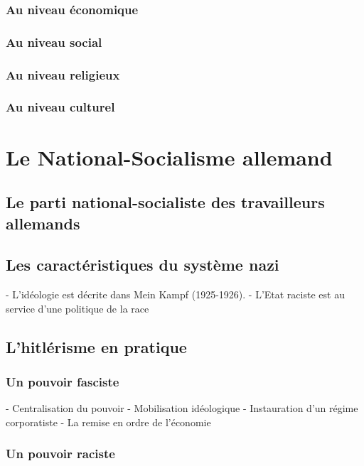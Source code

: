 \documentclass[12pt]{report}
\begin{document}
\subsubsection{Au niveau économique}

\subsubsection{Au niveau social}

\subsubsection{Au niveau religieux}

\subsubsection{Au niveau culturel}

\section{Le National-Socialisme allemand}

\subsection{Le parti national-socialiste des travailleurs allemands}

\subsection{Les caractéristiques du système nazi}

- L’idéologie est décrite dans Mein Kampf (1925-1926).
- L’Etat raciste est au service d’une politique de la race

\subsection{L'hitlérisme en pratique}

\subsubsection{Un pouvoir fasciste}

- Centralisation du pouvoir
- Mobilisation idéologique
- Instauration d’un régime corporatiste
- La remise en ordre de l’économie

\subsubsection{Un pouvoir raciste}
\end{document}
